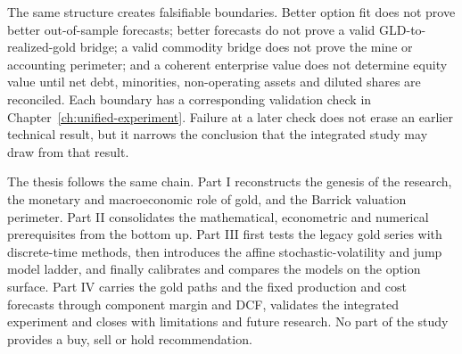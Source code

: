 The same structure creates falsifiable boundaries. Better option fit does not
prove better out-of-sample forecasts; better forecasts do not prove a valid
GLD-to-realized-gold bridge; a valid commodity bridge does not prove the mine
or accounting perimeter; and a coherent enterprise value does not determine
equity value until net debt, minorities, non-operating assets and diluted
shares are reconciled. Each boundary has a corresponding validation check in
Chapter~\ref{ch:unified-experiment}. Failure at a later check does not erase an earlier technical
result, but it narrows the conclusion that the integrated study may draw from
that result.

The thesis follows the same chain. Part I reconstructs the genesis of the
research, the monetary and macroeconomic role of gold, and the Barrick
valuation perimeter. Part II consolidates the mathematical, econometric and
numerical prerequisites from the bottom up. Part III first tests the legacy
gold series with discrete-time methods, then introduces the affine
stochastic-volatility and jump model ladder, and finally calibrates and
compares the models on the option surface. Part IV carries the gold paths and
the fixed production and cost forecasts through component margin and DCF,
validates the integrated experiment and closes with limitations and future
research. No part of the
study provides a buy, sell or hold recommendation.
